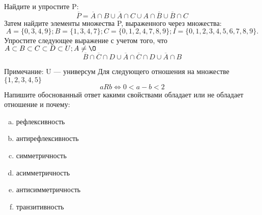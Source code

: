 \documentclass[10pt]{exam}
\begin{document}
\begin{questions}
\question
Найдите и упростите P:
\begin{equation*}
\overline{P} = \overline{A} \cap B \cup \overline{A} \cap C \cup A \cap \overline{B} \cup \overline{B} \cap C
\end{equation*}
Затем найдите элементы множества P, выраженного через множества:
\begin{equation*}
A = \{0, 3, 4, 9\}; 
B = \{1, 3, 4, 7\};
C = \{0, 1, 2, 4, 7, 8, 9\};
I = \{0, 1, 2, 3, 4, 5, 6, 7, 8, 9\}.
\end{equation*}\question
Упростите следующее выражение с учетом того, что $A\subset B \subset C \subset D \subset U; A \neq \O$
\begin{equation*}
\overline{B} \cap \overline{C} \cap D \cup \overline{A} \cap \overline{C} \cap D \cup \overline{A} \cap B
\end{equation*}

Примечание: U — универсум\question
Для следующего отношения на множестве $\{1, 2, 3, 4, 5\}$ 
\begin{equation*}
aRb \iff 0 < a-b<2
\end{equation*}
Напишите обоснованный ответ какими свойствами обладает или не обладает отношение и почему:   
\begin{enumerate} [a)]\setcounter{enumi}{0}
\item рефлексивность
\item антирефлексивность
\item симметричность
\item асимметричность
\item антисимметричность
\item транзитивность
\end{enumerate}


\end{questions}
\end{document}
